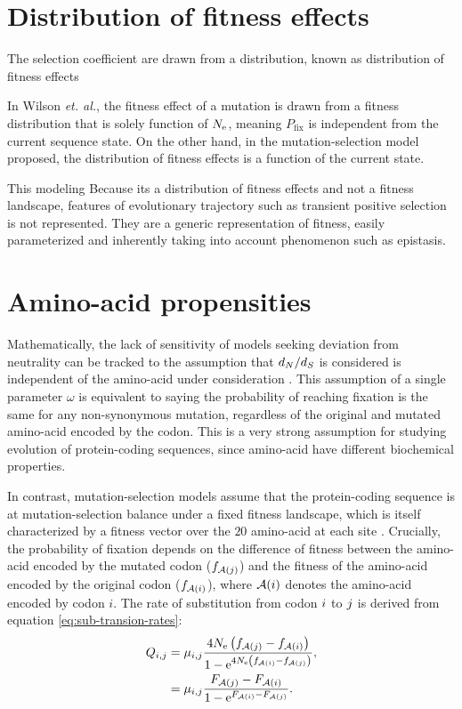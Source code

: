 \section{Distribution of fitness effects}

The selection coefficient are drawn from a distribution, known as distribution of fitness effects
\citep{Welch2008}

In Wilson \textit{et.
al.}, the fitness effect of a mutation is drawn from a fitness distribution that is solely function of $N_{\textrm{e}}$, meaning ${P_{\mathrm{fix}}}$ is independent from the current sequence state.
On the other hand, in the mutation-selection model proposed, the distribution of fitness effects is a function of the current state.

This modeling 
Because its a distribution of fitness effects and not a fitness landscape, features of evolutionary trajectory such as transient positive selection is not represented.
They are a generic representation of fitness, easily parameterized and inherently taking into account phenomenon such as epistasis.


\section{Amino-acid propensities}
Mathematically, the lack of sensitivity of models seeking deviation from neutrality can be tracked to the assumption that $d_N / d_S$ is considered is independent of the amino-acid under consideration \citep{Rodrigue2008a}.
This assumption of a single parameter $\omega$ is equivalent to saying the probability of reaching fixation is the same for any non-synonymous mutation, regardless of the original and mutated amino-acid encoded by the codon.
This is a very strong assumption for studying evolution of protein-coding sequences, since amino-acid have different biochemical properties.

In contrast, mutation-selection models assume that the protein-coding sequence is at mutation-selection balance under a fixed fitness landscape, which is itself characterized by a fitness vector over the $20$ amino-acid at each site \citep{Yang2008, Halpern1998, Rodrigue2010}.
Crucially, the probability of fixation depends on the difference of fitness between the amino-acid encoded by the mutated \gls{codon} ($f_{\mathcal{A}({j})}$) and the fitness of the amino-acid encoded by the original \gls{codon} ($f_{\mathcal{A}({i})}$), where $\mathcal{A}({i})$ denotes the amino-acid encoded by codon $i$.
The rate of \gls{substitution} from \gls{codon} ${i}$ to ${j}$ is derived from equation \ref{eq:sub-transion-rates}:
\begin{align}
Q_{{i}, {j}}  & = \mu_{{i}, {j}} \dfrac{4 N_{\textrm{e}} \left({f_{\mathcal{A}({j})} - f_{\mathcal{A}({i})}}\right)}{{1 - \mathrm{e}^{4 N_{\textrm{e}} \left({f_{\mathcal{A}({i})} - f_{\mathcal{A}({j})}}\right)} }}, \\
& = \mu_{{i}, {j}} \dfrac{F_{\mathcal{A}({j})} - F_{\mathcal{A}({i})}}{1 - \mathrm{e}^{F_{\mathcal{A}({i})} - F_{\mathcal{A}({j})}} }.
\end{align}

